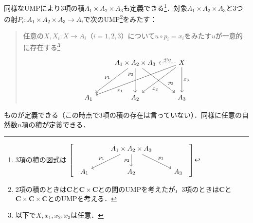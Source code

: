 \documentclass[dvipdfmx,a4j,10pt]{jsarticle}
\theoremstyle{mystyle1}
\theoremstyle{mystyle2}
\begin{document}
同様なUMPにより3項の積$A_1\times A_2\times A_3$も定義できる\footnote{
	3項の積の図式は
	$\left[
			\begin{tabular}{l}
				\begin{tikzcd}
					& A_1\times A_2\times A_3 \arrow[dl,"p_1"'] \arrow[d,"p_2"'] \arrow[dr,"p_3"]\\
					A_1 & A_2 & A_3
				\end{tikzcd}
			\end{tabular}
			\right]$
}．対象$A_1\times A_2\times A_3$と3つの射$P_i:A_1\times A_2\times A_3\to A_i$で次のUMP\footnote{2項の積のときは$\mathbf{C}$と$\mathbf{C}\times\mathbf{C}$との間のUMPを考えたが，3項のときは$\mathbf{C}$と$\mathbf{C}\times \mathbf{C}\times \mathbf{C}$とのUMPを考える．}をみたす：
\begin{quote}
	任意の$X,X_i:X\to A_i$（$i=1,2,3$）について$u\circ p_i=x_i$をみたす$u$が一意的に存在する\footnote{以下で$X,x_1,x_2,x_3$は任意．}
	\[
		\begin{tikzcd}[row sep=huge]
			& A_1\times A_2\times A_3 \arrow[dl,"p_1"'] \arrow[d,"p_2"',near start] \arrow[dr,"p_3",near end]& X \arrow[l,dashed,"\exists ! u"'] \arrow[lld,"x_1",near end] \arrow[ld,"x_2",near end] \arrow[d,"x_3"] \\
			A_1 & A_2 & A_3
		\end{tikzcd}
	\]
\end{quote}
ものが定義できる（この時点で3項の積の存在は言っていない）．同様に任意の自然数$n$項の積が定義できる．
\end{document}
